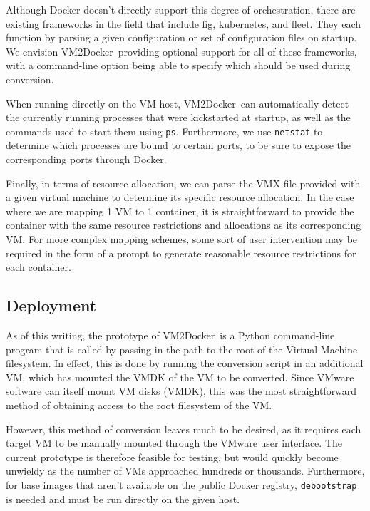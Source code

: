 \documentclass[\myfontsize, letterpaper]{article}
\newcommand{\projectname}{VM2Docker}
\begin{document}
Although Docker doesn't directly support this degree of orchestration, there are existing frameworks in the field that include fig\cite{fig}, kubernetes\cite{kubernetes}, and fleet\cite{fleet}. They each function by parsing a given configuration or set of configuration files on startup. We envision \projectname\ providing optional support for all of these frameworks, with a command-line option being able to specify which should be used during conversion.

When running directly on the VM host, \projectname\ can automatically detect the currently running processes that were kickstarted at startup, as well as the commands used to start them using \texttt{ps}. Furthermore, we use \texttt{netstat} to determine which processes are bound to certain ports, to be sure to expose the corresponding ports through Docker.

Finally, in terms of resource allocation, we can parse the VMX file provided with a given virtual machine to determine its specific resource allocation. In the case where we are mapping 1 VM to 1 container, it is straightforward to provide the container with the same resource restrictions and allocations as its corresponding VM. For more complex mapping schemes, some sort of user intervention may be required in the form of a prompt to generate reasonable resource restrictions for each container.

\subsection{Deployment}
As of this writing, the prototype of \projectname\ is a Python command-line program that is called by passing in the path to the root of the Virtual Machine filesystem. In effect, this is done by running the conversion script in an additional VM, which has mounted the VMDK of the VM to be converted. Since VMware software can itself mount VM disks (VMDK), this was the most straightforward method of obtaining access to the root filesystem of the VM. 

However, this method of conversion leaves much to be desired, as it requires each target VM to be manually mounted through the VMware user interface. The current prototype is therefore feasible for testing, but would quickly become unwieldy as the number of VMs approached hundreds or thousands. Furthermore, for base images that aren't available on the public Docker registry, \texttt{debootstrap} is needed and must be run directly on the given host.
\end{document}
